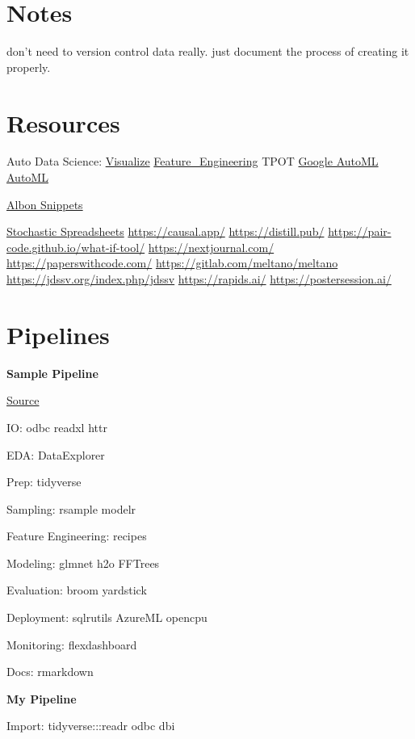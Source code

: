 \documentclass[]{book}
\begin{document}
\hypertarget{notes}{%
\section{Notes}\label{notes}}

don't need to version control data really. just document the process of creating it properly.

\hypertarget{resources}{%
\section{Resources}\label{resources}}

Auto Data Science: \href{http://holoviews.org}{Visualize} \href{https://www.featuretools.com}{Feature\_Engineering} TPOT \href{https://cloud.google.com/automl/}{Google AutoML} \href{https://www.automl.org/}{AutoML}

\href{https://chrisalbon.com/}{Albon Snippets}

\href{https://www.getguesstimate.com/}{Stochastic Spreadsheets} \url{https://causal.app/} \url{https://distill.pub/} \url{https://pair-code.github.io/what-if-tool/} \url{https://nextjournal.com/} \url{https://paperswithcode.com/} \url{https://gitlab.com/meltano/meltano} \url{https://jdssv.org/index.php/jdssv} \url{https://rapids.ai/} \url{https://postersession.ai/}

\hypertarget{pipelines}{%
\section{Pipelines}\label{pipelines}}

\textbf{Sample Pipeline}

\href{https://mobile.twitter.com/TheStephLocke/status/990251709531344896}{Source}

IO: odbc readxl httr

EDA: DataExplorer

Prep: tidyverse

Sampling: rsample modelr

Feature Engineering: recipes

Modeling: glmnet h2o FFTrees

Evaluation: broom yardstick

Deployment: sqlrutils AzureML opencpu

Monitoring: flexdashboard

Docs: rmarkdown

\textbf{My Pipeline}

Import: tidyverse:::readr odbc dbi
\end{document}
